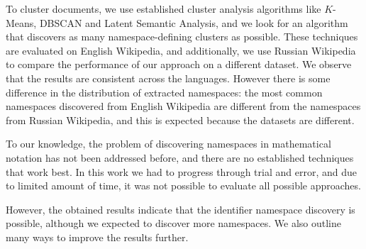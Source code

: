 
To cluster documents, we use established cluster analysis algorithms like
$K$-Means, DBSCAN and Latent Semantic Analysis, and we look for an algorithm 
that discovers as many namespace-defining clusters as possible. 
These techniques are evaluated on English Wikipedia, and additionally, we use Russian
Wikipedia to compare the performance of our approach on a different dataset. 
We observe that the results are consistent across the languages. However there is some 
difference in the distribution of extracted namespaces: the most common 
namespaces discovered from English Wikipedia are different from the namespaces 
from Russian Wikipedia, and this is expected because the datasets are different. 

To our knowledge, the problem of discovering namespaces in mathematical notation
has not been addressed before, and there are no established techniques that 
work best. In this work we had to progress through trial and error, and 
due to limited amount of time, it was not possible to evaluate all possible 
approaches.

However, the obtained results indicate that the identifier namespace discovery is
possible, although we expected to discover more namespaces. We also outline many 
ways to improve the results further.

